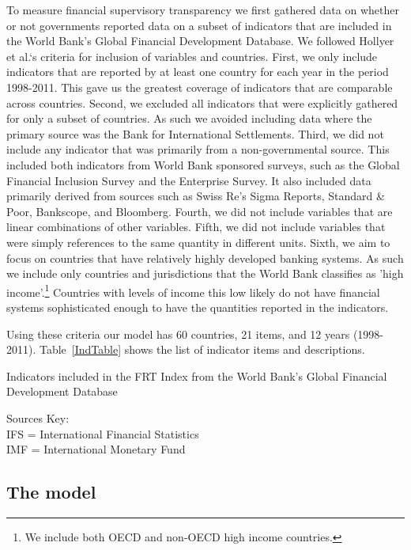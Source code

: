 \documentclass[a4paper]{article}
\begin{document}
To measure financial supervisory transparency we first gathered data on whether or not governments reported data on a subset of indicators that are included in the World Bank's Global Financial Development Database. We followed Hollyer et al.`s \citeyearpar{Hollyer2014} criteria for inclusion of variables and countries. First, we only include indicators that are reported by at least one country for each year in the period 1998-2011. This gave us the greatest coverage of indicators that are comparable across countries. Second, we excluded all indicators that were explicitly gathered for only a subset of countries. As such we avoided including data where the primary source was the Bank for International Settlements. Third, we did not include any indicator that was primarily from a non-governmental source. This included both indicators from World Bank sponsored surveys, such as the Global Financial Inclusion Survey and the Enterprise Survey. It also included data primarily derived from sources such as Swiss Re's Sigma Reports, Standard \& Poor, Bankscope, and Bloomberg. Fourth, we did not include variables that are linear combinations of other variables. Fifth, we did not include variables that were simply references to the same quantity in different units. Sixth, we aim to focus on countries that have relatively highly developed banking systems. As such we include only countries and jurisdictions that the World Bank classifies as 'high income'.\footnote{We include both OECD and non-OECD high income countries.} Countries with levels of income this low likely do not have financial systems sophisticated enough to have the quantities reported in the indicators. 

Using these criteria our model has 60 countries, 21 items, and 12 years (1998-2011). Table~\ref{IndTable} shows the list of indicator items and descriptions.  

\begin{table}[ht]
    \caption{Indicators included in the FRT Index from the World Bank's Global Financial Development Database}
    \label{IndTable}
    \vspace{0.3cm}
    \scalebox{0.95}{
        
    }
    {\scriptsize{Sources Key:\\ 
    IFS = International Financial Statistics\\
    IMF = International Monetary Fund}}
\end{table}

\subsection{The model}
\end{document}
